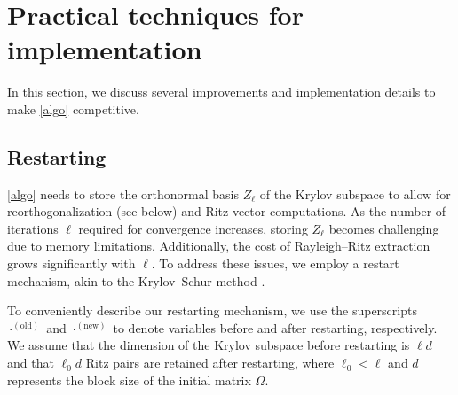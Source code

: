 \documentclass{siamart190516}
\newcommand{\old}{\mathrm{old}}
\newcommand{\new}{\mathrm{new}}
\begin{document}
\section{Practical techniques for implementation}
\label{sec:implementation}
In this section, we discuss several improvements and implementation details to make \cref{algo} competitive.
\subsection{Restarting}
\cref{algo} needs to store the orthonormal basis $Z_{\ell}$ of the Krylov subspace to allow for reorthogonalization (see below) and Ritz vector computations. As the number of iterations $\ell$ required for convergence increases, storing $Z_{\ell}$ becomes challenging due to memory limitations. Additionally, the cost of Rayleigh--Ritz extraction grows significantly with $\ell$. To address these issues, we employ a restart mechanism, akin to the Krylov--Schur method \cite{Stewart2002, Zhou2008,Wu2000}.

To conveniently describe our restarting mechanism, we use the superscripts $\cdot^{(\old)}$ and $\cdot^{(\new)}$ to denote variables before and after restarting, respectively.
We assume that the dimension of the Krylov subspace before restarting is $\ell d$ and that 
$\ell_{0}d$ Ritz pairs are retained after restarting, where $\ell_0 < \ell$ and $d$ represents the block size of the initial matrix $\Omega$. 
\end{document}
